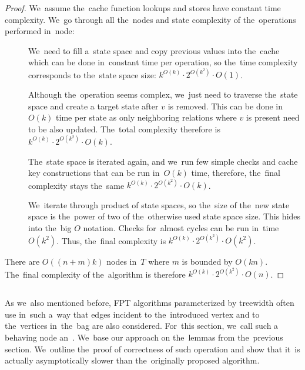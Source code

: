 \begin{proof}
	We~assume the~cache function lookups and stores have constant time complexity.
	We~go through all the~nodes and state complexity of the~operations performed in~node:
	\begin{description}
		\item[\IntroduceVertexNode{}]
		      We~need to fill a~state space and copy previous values into the~cache
		      which can be done in~constant time per operation,
		      so the~time complexity corresponds to the~state space size:
		      \( {k}^{O(k)} \cdot 2^{O(k^2)} \cdot O(1) \).
		\item[\ForgetVertexNode{}]
		      Although the~operation seems complex, we~just need to traverse the~state space
		      and create a target state after \( v \) is removed.
		      This can be done in~\( O(k) \) time
		      per state as only neighboring relations where \( v \) is present
		      need to be also updated.
		      The~total complexity therefore is
		      \( {k}^{O(k)} \cdot 2^{O(k^2)} \cdot O(k) \).
		\item[\IntroduceEdgeNode{}]
		      The~state space is iterated again, and we~run few simple checks and cache key constructions
		      that can be run in~\( O(k) \) time, therefore, the~final complexity stays the~same
		      \( {k}^{O(k)} \cdot 2^{O(k^2)} \cdot O(k) \).
		\item[\JoinNode{}]
		      We~iterate through product of state spaces,
		      so the~size of the~new state space is the~power of two
		      of the~otherwise used state space size.
		      This hides into the~big \( O \) notation.
		      Checks for~almost cycles can be run in~time \( O(k^2) \).
		      Thus, the~final complexity is
		      \( {k}^{O(k)} \cdot 2^{O(k^2)} \cdot O(k^2) \).
	\end{description}
	There are \( O((n+m)k) \) nodes in~\( T \) where \( m \) is bounded by \( O(kn) \).
	The~final complexity of the~algorithm is therefore
	\( {k}^{O(k)} \cdot 2^{O(k^2)} \cdot O(n) \).
\end{proof}
%

\subsection{\IntroduceVertexWithEdgesNode{}}

As we~also mentioned before, FPT algorithms parameterized by treewidth
often use \IntroduceVertexNode{} in~such a~way
that edges incident to the~introduced vertex and to
the~vertices in~the~bag are also considered.
For~this section, we~call such a behaving node an~\IntroduceVertexWithEdgesNode{}.
%
We~base our approach on the~lemmas from the~previous section.
We~outline the~proof of correctness of such operation and show
that it~is actually asymptotically slower than the~originally proposed algorithm.

